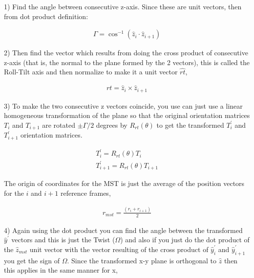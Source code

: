 1) Find  the angle between  consecutive z-axis.  Since these  are unit
vectors, then from dot product definition:

\begin{gather}
\Gamma = \cos^{-1} (\hat{z}_i \cdot \hat{z}_{i+1})
\end{gather}


2) Then find the vector which  results from doing the cross product of
consecutive z-axis (that  is, the normal to the plane  formed by the 2
vectors), this is called the Roll-Tilt axis and then normalize to make
it a unit vector $\hat{rt}$,

\begin{gather}
rt = \hat{z}_i \times \hat{z}_{i+1}
\end{gather}

3) To  make the  two  consecutive z  vectors  coincide, you use can just
use a linear homogeneous transformation of the plane so that the  original
orientation matrices $T_i$ and $T_{i+1}$ are rotated $ \pm \Gamma / 2$
degrees  by  $R_{rt}(\theta)$ to  get  the  transformed $T_i^{'}$  and
$T_{i+1}^{'}$ orientation matrices.

\begin{gather}
T_i^{'} = R_{rt}(\theta) T_{i} \\ T_{i+1}^{'} = R_{rt}(\theta) T_{i+1}
\end{gather}

The  origin of  coordinates for  the MST  is just  the average  of the
position vectors for the $i$ and $i+1$ reference frames,

\begin{gather}
r_{mst} = \frac{(r_i + r_{i+1})} {2}
\end{gather}

4) Again  using the dot  product you  can find  the angle  between the
transformed $\hat{y}^{'}$ vectors and this is just the Twist ($\Omega$) and
also if you just do the dot product of the $\hat{z}_{mst}$ unit vector with 
the vector resulting of the cross product of $\hat{y}_{i}^{'}$ and $\hat{y}_{i+1}^{'}$ you 
get the sign of $\Omega$. Since the transformed x-y plane is orthogonal to $\hat{z}$ then
this applies in the same manner for x,

